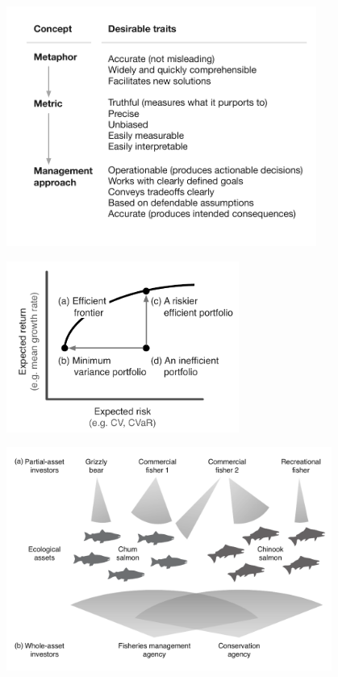 \begin{figure}[htbp]
\centering
\includegraphics[width=4in]{mmm-traits.pdf}
\caption{}
\label{fig:traits}
\end{figure}

\clearpage

\begin{figure}[htbp]
\centering
\includegraphics[width=3in]{efficient-frontier-fig.pdf}
\caption{}
\label{fig:mpt}
\end{figure}

\clearpage

\begin{figure}[htbp]
\centering
\includegraphics[width=4.2in]{salmon-portfolios-bw.pdf}
\caption{}
\label{fig:salmonport}
\end{figure}

